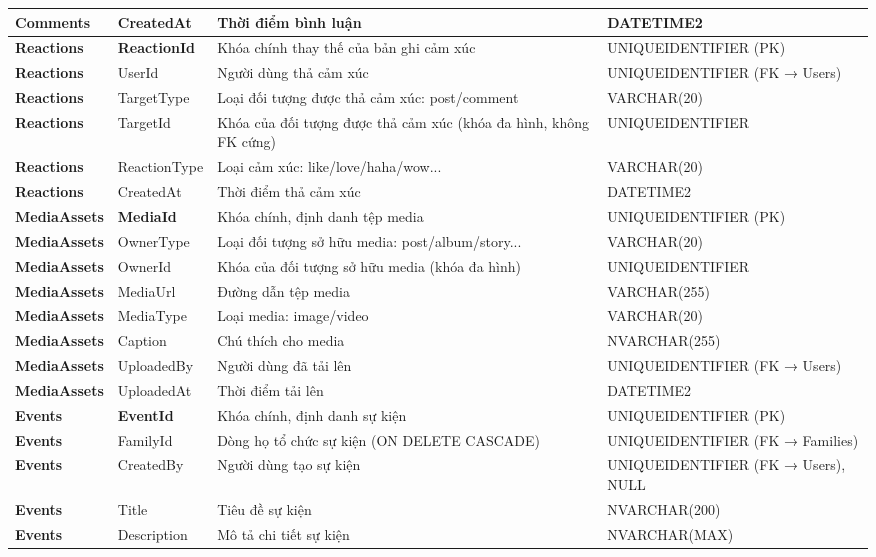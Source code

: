 \begin{longtable}{|p{}|p{}|p{}|p{}|}
\textbf{Comments} & CreatedAt & Thời điểm bình luận & DATETIME2 \\ \hline
\textbf{Reactions} & \textbf{ReactionId} & Khóa chính thay thế của bản ghi cảm xúc & UNIQUEIDENTIFIER (PK) \\ \hline
\textbf{Reactions} & UserId & Người dùng thả cảm xúc & UNIQUEIDENTIFIER (FK → Users) \\ \hline
\textbf{Reactions} & TargetType & Loại đối tượng được thả cảm xúc: post/comment & VARCHAR(20) \\ \hline
\textbf{Reactions} & TargetId & Khóa của đối tượng được thả cảm xúc (khóa đa hình, không FK cứng) & UNIQUEIDENTIFIER \\ \hline
\textbf{Reactions} & ReactionType & Loại cảm xúc: like/love/haha/wow... & VARCHAR(20) \\ \hline
\textbf{Reactions} & CreatedAt & Thời điểm thả cảm xúc & DATETIME2 \\ \hline
\textbf{MediaAssets} & \textbf{MediaId} & Khóa chính, định danh tệp media & UNIQUEIDENTIFIER (PK) \\ \hline
\textbf{MediaAssets} & OwnerType & Loại đối tượng sở hữu media: post/album/story... & VARCHAR(20) \\ \hline
\textbf{MediaAssets} & OwnerId & Khóa của đối tượng sở hữu media (khóa đa hình) & UNIQUEIDENTIFIER \\ \hline
\textbf{MediaAssets} & MediaUrl & Đường dẫn tệp media & VARCHAR(255) \\ \hline
\textbf{MediaAssets} & MediaType & Loại media: image/video & VARCHAR(20) \\ \hline
\textbf{MediaAssets} & Caption & Chú thích cho media & NVARCHAR(255) \\ \hline
\textbf{MediaAssets} & UploadedBy & Người dùng đã tải lên & UNIQUEIDENTIFIER (FK → Users) \\ \hline
\textbf{MediaAssets} & UploadedAt & Thời điểm tải lên & DATETIME2 \\ \hline
\textbf{Events} & \textbf{EventId} & Khóa chính, định danh sự kiện & UNIQUEIDENTIFIER (PK) \\ \hline
\textbf{Events} & FamilyId & Dòng họ tổ chức sự kiện (ON DELETE CASCADE) & UNIQUEIDENTIFIER (FK → Families) \\ \hline
\textbf{Events} & CreatedBy & Người dùng tạo sự kiện & UNIQUEIDENTIFIER (FK → Users), NULL \\ \hline
\textbf{Events} & Title & Tiêu đề sự kiện & NVARCHAR(200) \\ \hline
\textbf{Events} & Description & Mô tả chi tiết sự kiện & NVARCHAR(MAX) \\ \hline

\end{longtable}
